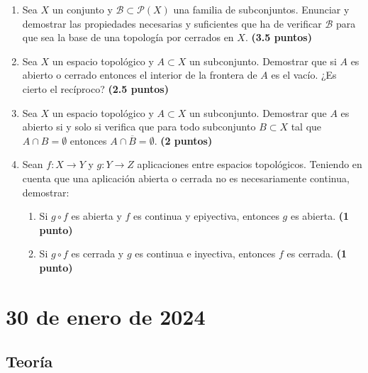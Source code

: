 \begin{enumerate}
    \item Sea $X$ un conjunto y $\mathcal{B} \subset \mathcal{P}(X)$ una familia de subconjuntos. Enunciar y demostrar las propiedades necesarias y suficientes que ha de verificar $\mathcal{B}$ para que sea la base de una topología por cerrados en $X$.
    \hfill \textbf{(3.5 puntos)}

    \item Sea $X$ un espacio topológico y $A \subset X$ un subconjunto. Demostrar que si $A$ es abierto o cerrado entonces el interior de la frontera de $A$ es el vacío. ¿Es cierto el recíproco?
    \hfill \textbf{(2.5 puntos)}

    \item Sea $X$ un espacio topológico y $A \subset X$ un subconjunto. Demostrar que $A$ es abierto si y solo si verifica que para todo subconjunto $B \subset X$ tal que $A \cap B = \emptyset$ entonces $A \cap \overline{B} = \emptyset$.
    \hfill \textbf{(2 puntos)}

    \item Sean $f : X \to Y$ y $g : Y \to Z$ aplicaciones entre espacios topológicos. Teniendo en cuenta que una aplicación abierta o cerrada no es necesariamente continua, demostrar:
    \begin{enumerate}
        \item Si $g \circ f$ es abierta y $f$ es continua y epiyectiva, entonces $g$ es abierta.
        \hfill \textbf{(1 punto)}
        \item Si $g \circ f$ es cerrada y $g$ es continua e inyectiva, entonces $f$ es cerrada.
        \hfill \textbf{(1 punto)}
    \end{enumerate}
\end{enumerate}

\newpage

\section{30 de enero de 2024}

\subsection{Teoría}

